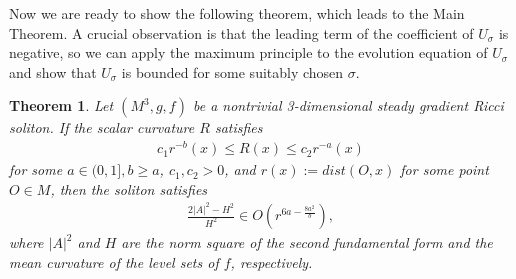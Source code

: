 \documentclass[12pt,a4paper]{amsart}
\newtheorem{Thm}{Theorem}
\begin{document}
Now we are ready to show the following theorem, which leads to the Main Theorem.
A crucial observation is that the leading term of the coefficient of $U_\sigma$ is negative,
so we can apply the maximum principle to the evolution equation of $U_\sigma$ and show that $U_\sigma$ is bounded for some suitably chosen $\sigma$.

\begin{Thm} \label{theorem1}
Let $(M^3, g, f)$ be a nontrivial 3-dimensional steady gradient Ricci soliton.
If the scalar curvature $R$ satisfies
\begin{align*}
c_1 r^{-b}(x)\leq R(x)\leq c_2 r^{-a}(x)
\end{align*}
for some $a\in(0,1], b\geq a$, $c_1,c_2>0$, and $r(x):=dist(O,x)$ for some point $O\in M$,
then the soliton satisfies
\begin{align*}
\frac{2|A|^2-H^2}{H^2}\in O\left(r^{6a-\frac{8a^2}{b}}\right),
\end{align*}
where $|A|^2$ and $H$ are the norm square of the second fundamental form and the mean curvature of
the level sets of $f$, respectively.
\end{Thm}
\end{document}
